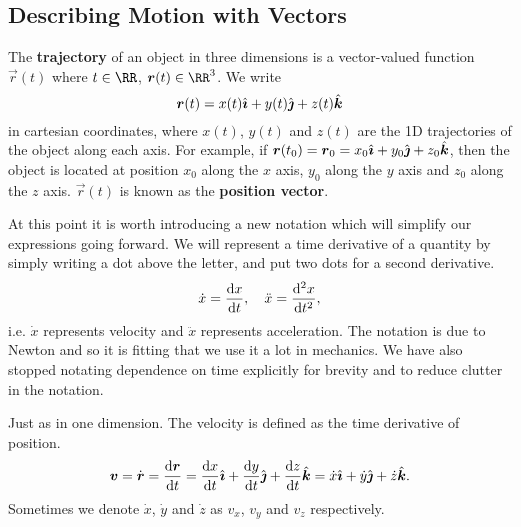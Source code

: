 \documentclass[../classical_mechanics.tex]{subfiles}
\begin{document}
        \subsection{Describing Motion with Vectors}\label{subsec:describing-motion-with-vectors}
            \begin{definition}
                The \textbf{trajectory} of an object in three dimensions is a vector-valued function $\vec{r}(t)$ where $t\in\RR$, $\vec{r}(t)\in\RR^3$.
                We write
                \begin{equation}
                    \boldsymbol{r}(t)=x(t)\hat{\boldsymbol{\imath}}+y(t)\hat{\boldsymbol{\jmath}}+z(t)\hat{\boldsymbol{k}}
                \end{equation}
                in cartesian coordinates, where $x(t)$, $y(t)$ and $z(t)$ are the 1D trajectories of the object along each axis.
                For example, if $\boldsymbol{r}(t_0)=\boldsymbol{r}_0=x_0\hat{\boldsymbol{\imath}}+y_0\hat{\boldsymbol{\jmath}}+z_0\hat{\boldsymbol{k}}$, then the object is located at position $x_0$ along the $x$ axis, $y_0$ along the $y$ axis and $z_0$ along the $z$ axis.
                $\vec{r}(t)$ is known as the \textbf{position vector}.
            \end{definition}
            At this point it is worth introducing a new notation which will simplify our expressions going forward.
            We will represent a time derivative of a quantity by simply writing a dot above the letter, and put two dots for a second derivative.
            \begin{equation}
                \dot{x}=\dv{x}{t},\quad\ddot{x}=\dv[2]{x}{t},
            \end{equation}
            i.e. $\dot x$ represents velocity and $\ddot x$ represents acceleration.
            The notation is due to Newton and so it is fitting that we use it a lot in mechanics.
            We have also stopped notating dependence on time explicitly for brevity and to reduce clutter in the notation.
            \begin{definition}
                Just as in one dimension.
                The velocity is defined as the time derivative of position.
                \begin{equation}
                    \vec{v}=\dot{\vec{r}}=\dv{\vec{r}}{t}=\dv{x}{t}\ihat+\dv{y}{t}\jhat+\dv{z}{t}\khat=\dot{x}\ihat+\dot{y}\jhat+\dot{z}\khat.
                \end{equation}
                Sometimes we denote $\dot{x}$, $\dot{y}$ and $\dot{z}$ as $v_x$, $v_y$ and $v_z$ respectively.
            \end{definition}
\end{document}
